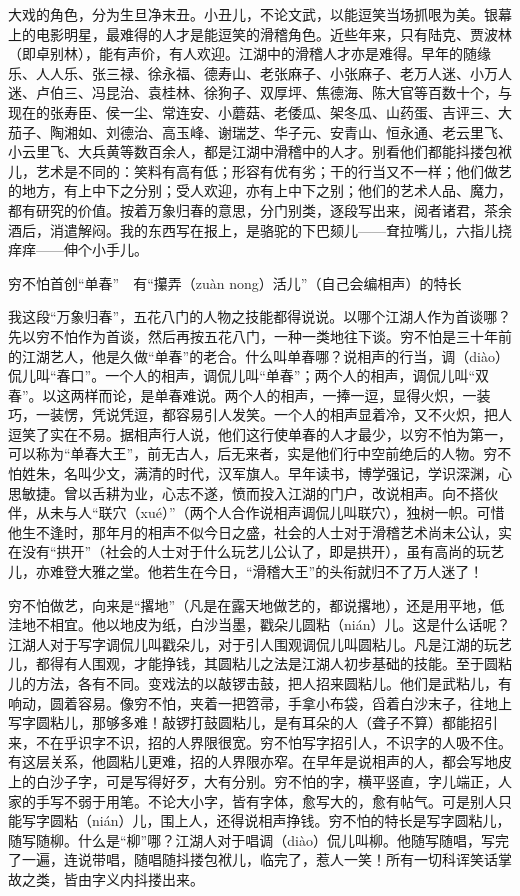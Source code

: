 \documentclass[12pt,UTF8]{ctexbook}
\begin{document}
大戏的角色，分为生旦净末丑。小丑儿，不论文武，以能逗笑当场抓哏为美。银幕上的电影明星，最难得的人才是能逗笑的滑稽角色。近些年来，只有陆克、贾波林（即卓别林），能有声价，有人欢迎。江湖中的滑稽人才亦是难得。早年的随缘乐、人人乐、张三禄、徐永福、德寿山、老张麻子、小张麻子、老万人迷、小万人迷、卢伯三、冯昆治、袁桂林、徐狗子、双厚坪、焦德海、陈大官等百数十个，与现在的张寿臣、侯一尘、常连安、小蘑菇、老倭瓜、架冬瓜、山药蛋、吉评三、大茄子、陶湘如、刘德治、高玉峰、谢瑞芝、华子元、安青山、恒永通、老云里飞、小云里飞、大兵黄等数百余人，都是江湖中滑稽中的人才。别看他们都能抖搂包袱儿，艺术是不同的：笑料有高有低；形容有优有劣；干的行当又不一样；他们做艺的地方，有上中下之分别；受人欢迎，亦有上中下之别；他们的艺术人品、魔力，都有研究的价值。按着万象归春的意思，分门别类，逐段写出来，阅者诸君，茶余酒后，消遣解闷。我的东西写在报上，是骆驼的下巴颏儿——耷拉嘴儿，六指儿挠痒痒——伸个小手儿。





穷不怕首创“单春”　有“攥弄（zuàn nong）活儿”（自己会编相声）的特长


我这段“万象归春”，五花八门的人物之技能都得说说。以哪个江湖人作为首谈哪？先以穷不怕作为首谈，然后再按五花八门，一种一类地往下谈。穷不怕是三十年前的江湖艺人，他是久做“单春”的老合。什么叫单春哪？说相声的行当，调（diào）侃儿叫“春口”。一个人的相声，调侃儿叫“单春”；两个人的相声，调侃儿叫“双春”。以这两样而论，是单春难说。两个人的相声，一捧一逗，显得火炽，一装巧，一装愣，凭说凭逗，都容易引人发笑。一个人的相声显着冷，又不火炽，把人逗笑了实在不易。据相声行人说，他们这行使单春的人才最少，以穷不怕为第一，可以称为“单春大王”，前无古人，后无来者，实是他们行中空前绝后的人物。穷不怕姓朱，名叫少文，满清的时代，汉军旗人。早年读书，博学强记，学识深渊，心思敏捷。曾以舌耕为业，心志不遂，愤而投入江湖的门户，改说相声。向不搭伙伴，从未与人“联穴（xué）”（两个人合作说相声调侃儿叫联穴），独树一帜。可惜他生不逢时，那年月的相声不似今日之盛，社会的人士对于滑稽艺术尚未公认，实在没有“拱开”（社会的人士对于什么玩艺儿公认了，即是拱开），虽有高尚的玩艺儿，亦难登大雅之堂。他若生在今日，“滑稽大王”的头衔就归不了万人迷了！

穷不怕做艺，向来是“撂地”（凡是在露天地做艺的，都说撂地），还是用平地，低洼地不相宜。他以地皮为纸，白沙当墨，戳朵儿圆粘（nián）儿。这是什么话呢？江湖人对于写字调侃儿叫戳朵儿，对于引人围观调侃儿叫圆粘儿。凡是江湖的玩艺儿，都得有人围观，才能挣钱，其圆粘儿之法是江湖人初步基础的技能。至于圆粘儿的方法，各有不同。变戏法的以敲锣击鼓，把人招来圆粘儿。他们是武粘儿，有响动，圆着容易。像穷不怕，夹着一把笤帚，手拿小布袋，舀着白沙末子，往地上写字圆粘儿，那够多难！敲锣打鼓圆粘儿，是有耳朵的人（聋子不算）都能招引来，不在乎识字不识，招的人界限很宽。穷不怕写字招引人，不识字的人吸不住。有这层关系，他圆粘儿更难，招的人界限亦窄。在早年是说相声的人，都会写地皮上的白沙子字，可是写得好歹，大有分别。穷不怕的字，横平竖直，字儿端正，人家的手写不弱于用笔。不论大小字，皆有字体，愈写大的，愈有帖气。可是别人只能写字圆粘（nián）儿，围上人，还得说相声挣钱。穷不怕的特长是写字圆粘儿，随写随柳。什么是“柳”哪？江湖人对于唱调（diào）侃儿叫柳。他随写随唱，写完了一遍，连说带唱，随唱随抖搂包袱儿，临完了，惹人一笑！所有一切科诨笑话掌故之类，皆由字义内抖搂出来。
\end{document}

